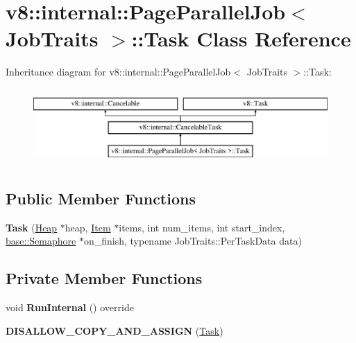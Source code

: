 \hypertarget{classv8_1_1internal_1_1_page_parallel_job_1_1_task}{}\section{v8\+:\+:internal\+:\+:Page\+Parallel\+Job$<$ Job\+Traits $>$\+:\+:Task Class Reference}
\label{classv8_1_1internal_1_1_page_parallel_job_1_1_task}
Inheritance diagram for v8\+:\+:internal\+:\+:Page\+Parallel\+Job$<$ Job\+Traits $>$\+:\+:Task\+:\begin{figure}[H]
\begin{center}
\leavevmode
\includegraphics[height=2.906574cm]{classv8_1_1internal_1_1_page_parallel_job_1_1_task}
\end{center}
\end{figure}
\subsection*{Public Member Functions}
\begin{DoxyCompactItemize}
\item 
{\bfseries Task} (\hyperlink{classv8_1_1internal_1_1_heap}{Heap} $\ast$heap, \hyperlink{structv8_1_1internal_1_1_page_parallel_job_1_1_item}{Item} $\ast$items, int num\+\_\+items, int start\+\_\+index, \hyperlink{classv8_1_1base_1_1_semaphore}{base\+::\+Semaphore} $\ast$on\+\_\+finish, typename Job\+Traits\+::\+Per\+Task\+Data data)\hypertarget{classv8_1_1internal_1_1_page_parallel_job_1_1_task_a1275c3e292f8ff164b1e2464dc044582}{}\label{classv8_1_1internal_1_1_page_parallel_job_1_1_task_a1275c3e292f8ff164b1e2464dc044582}

\end{DoxyCompactItemize}
\subsection*{Private Member Functions}
\begin{DoxyCompactItemize}
\item 
void {\bfseries Run\+Internal} () override\hypertarget{classv8_1_1internal_1_1_page_parallel_job_1_1_task_ae2545e62e984c7321464544f7cecc439}{}\label{classv8_1_1internal_1_1_page_parallel_job_1_1_task_ae2545e62e984c7321464544f7cecc439}

\item 
{\bfseries D\+I\+S\+A\+L\+L\+O\+W\+\_\+\+C\+O\+P\+Y\+\_\+\+A\+N\+D\+\_\+\+A\+S\+S\+I\+GN} (\hyperlink{classv8_1_1internal_1_1_page_parallel_job_1_1_task}{Task})\hypertarget{classv8_1_1internal_1_1_page_parallel_job_1_1_task_a810ec6aad5b87c8ec9b6214d124617ed}{}\label{classv8_1_1internal_1_1_page_parallel_job_1_1_task_a810ec6aad5b87c8ec9b6214d124617ed}

\end{DoxyCompactItemize}
